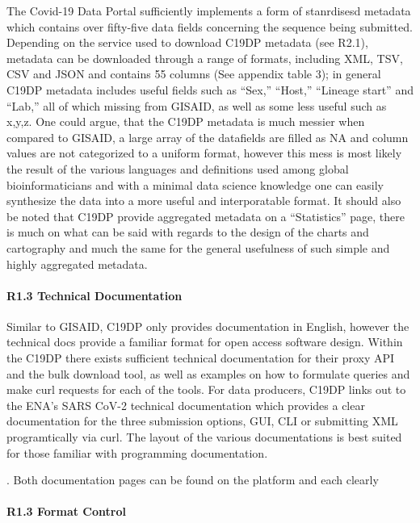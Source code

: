 \documentclass{article}
\begin{document}
The Covid-19 Data Portal sufficiently implements a form of stanrdisesd
metadata which contains over fifty-five data fields concerning the
sequence being submitted. Depending on the service used to download
C19DP metadata (see R2.1), metadata can be downloaded through a range of
formats, including XML, TSV, CSV and JSON and contains 55 columns (See
appendix table 3); in general C19DP metadata includes useful fields such
as ``Sex,'' ``Host,'' ``Lineage start'' and ``Lab,'' all of which
missing from GISAID, as well as some less useful such as x,y,z. One
could argue, that the C19DP metadata is much messier when compared to
GISAID, a large array of the datafields are filled as NA and column
values are not categorized to a uniform format, however this mess is
most likely the result of the various languages and definitions used
among global bioinformaticians and with a minimal data science knowledge
one can easily synthesize the data into a more useful and interporatable
format. It should also be noted that C19DP provide aggregated metadata
on a ``Statistics'' page, there is much on what can be said with regards
to the design of the charts and cartography and much the same for the
general usefulness of such simple and highly aggregated metadata.

\hypertarget{r1.3-technical-documentation}{%
\paragraph{R1.3 Technical
Documentation}\label{r1.3-technical-documentation}}

Similar to GISAID, C19DP only provides documentation in English, however
the technical docs provide a familiar format for open access software
design. Within the C19DP there exists sufficient technical documentation
for their proxy API and the bulk download tool, as well as examples on
how to formulate queries and make curl requests for each of the tools.
For data producers, C19DP links out to the ENA's SARS CoV-2 technical
documentation which provides a clear documentation for the three
submission options, GUI, CLI or submitting XML programtically via curl.
The layout of the various documentations is best suited for those
familiar with programming documentation.

. Both documentation pages can be found on the platform and each clearly

\hypertarget{r1.3-format-control-1}{%
\paragraph{R1.3 Format Control}\label{r1.3-format-control-1}}
\end{document}
